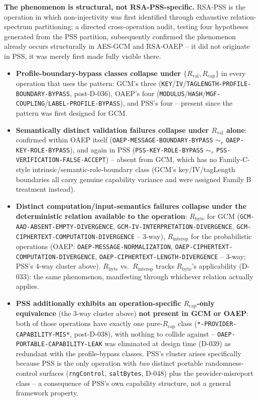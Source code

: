 \documentclass[11pt,a4paper]{article}
\begin{document}
\textbf{The phenomenon is structural, not RSA-PSS-specific.} RSA-PSS is the operation in which non-injectivity was first identified through exhaustive relation-spectrum partitioning; a directed cross-operation audit, testing four hypotheses generated from the PSS partition, subsequently confirmed the phenomenon already occurs structurally in AES-GCM and RSA-OAEP -- it did not originate in PSS, it was merely first made fully visible there.
\begin{itemize}
\item \textbf{Profile-boundary-bypass classes collapse under $\{R_{\text{val}}, R_{\text{cap}}\}$} in every operation that uses the pattern: GCM's three (\texttt{KEY}/\texttt{IV}/\texttt{TAGLENGTH-PROFILE-BOUNDARY-BYPASS}, post-D-036), OAEP's four (\texttt{MODULUS}/\texttt{HASH}/\texttt{MGF-COUPLING}/\texttt{LABEL-PROFILE-BYPASS}), and PSS's four -- present since the pattern was first designed for GCM.
\item \textbf{Semantically distinct validation failures collapse under $R_{\text{val}}$ alone}: confirmed within OAEP itself (\texttt{OAEP-MESSAGE-BOUNDARY-BYPASS} $\sim_r$ \texttt{OAEP-KEY-ROLE-BYPASS}), and again in PSS (\texttt{PSS-KEY-ROLE-BYPASS} $\sim_r$ \texttt{PSS-VERIFICATION-FALSE-ACCEPT}) -- absent from GCM, which has no Family-C-style intrinsic/semantic-role-boundary class (GCM's key/IV/tagLength boundaries all carry genuine capability variance and were assigned Family B treatment instead).
\item \textbf{Distinct computation/input-semantics failures collapse under the deterministic relation available to the operation}: $R_{\text{byte}}$ for GCM (\texttt{GCM-AAD-ABSENT-EMPTY-DIVERGENCE}, \texttt{GCM-IV-INTERPRETATION-DIVERGENCE}, \texttt{GCM-CIPHERTEXT-COMPUTATION-DIVERGENCE} -- 3-way), $R_{\text{interop}}$ for the probabilistic operations (OAEP: \texttt{OAEP-MESSAGE-NORMALIZATION}, \texttt{OAEP-CIPHERTEXT-COMPUTATION-DIVERGENCE}, \texttt{OAEP-CIPHERTEXT-LENGTH-DIVERGENCE} -- 3-way; PSS's 4-way cluster above). $R_{\text{byte}}$ vs.\ $R_{\text{interop}}$ tracks $R_{\text{byte}}$'s applicability (D-033): the same phenomenon, manifesting through whichever relation actually applies.
\item \textbf{PSS additionally exhibits an operation-specific $R_{\text{cap}}$-only equivalence} (the 3-way cluster above) \textbf{not present in GCM or OAEP}: both of those operations have exactly one pure-$R_{\text{cap}}$ class (\texttt{*-PROVIDER-CAPABILITY-MIS*}, post-D-038), with nothing to collide against -- \texttt{OAEP-PORTABLE-CAPABILITY-LEAK} was eliminated at design time (D-039) as redundant with the profile-bypass classes. PSS's cluster arises specifically because PSS is the only operation with \emph{two} distinct portable randomness-control surfaces (\texttt{rngControl}, \texttt{saltBytes}, D-048) plus the provider-misreport class -- a consequence of PSS's own capability structure, not a general framework property.
\end{itemize}
\end{document}
